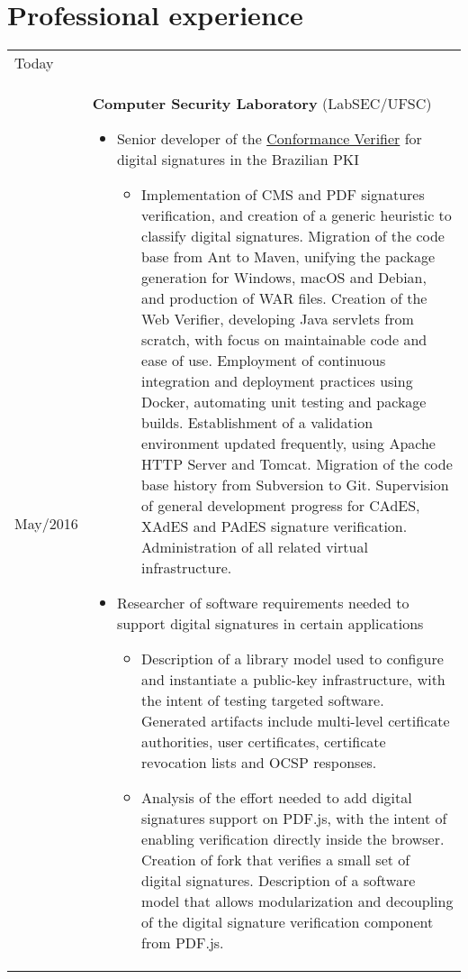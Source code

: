 \documentclass{article}
\newenvironment{contenttable}[1]
  {\section*{#1}
   \newcolumntype{L}{>{\bf \raggedleft}p{0.1\textwidth}}
   \newcolumntype{R}{p{0.82\textwidth}}
   \begin{tabular}{L!{\color{lightgray} \vrule}R}}
  {\end{tabular}}
\begin{document}
\begin{contenttable}{Professional experience}
  Today \\ May/2016 & \textbf{Computer Security Laboratory}
    (LabSEC/UFSC)
  \begin{itemize}
    \item Senior developer of the
        \href{https://verificador.iti.gov.br}{Conformance Verifier} for digital
          signatures in the Brazilian PKI
    \begin{itemize}
    \item Implementation of CMS and PDF signatures verification, and creation
        of a generic heuristic to classify digital signatures. Migration of
            the code base from Ant to Maven, unifying the package generation
            for Windows, macOS and Debian, and production of WAR files.
            Creation of the Web Verifier, developing Java servlets from
            scratch, with focus on maintainable code and ease of use.
            Employment of continuous integration and deployment practices using
            Docker, automating unit testing and package builds. Establishment
            of a validation environment updated frequently, using Apache HTTP
            Server and Tomcat. Migration of the code base history from
            Subversion to Git. Supervision of general development progress for
            CAdES, XAdES and PAdES signature verification.  Administration of
            all related virtual infrastructure.
    \end{itemize}
    \item Researcher of software requirements needed to support digital
        signatures in certain applications
    \begin{itemize}
      \item Description of a library model used to configure and instantiate a
          public-key infrastructure, with the intent of testing targeted
            software. Generated artifacts include multi-level certificate
            authorities, user certificates, certificate revocation lists and
            OCSP responses.
      \item Analysis of the effort needed to add digital signatures support on
          PDF.js, with the intent of enabling verification directly inside the
            browser. Creation of fork that verifies a small set of digital
            signatures. Description of a software model that allows
            modularization and decoupling of the digital signature verification
            component from PDF.js.

\end{itemize}
\end{itemize}
\end{contenttable}
\end{document}
